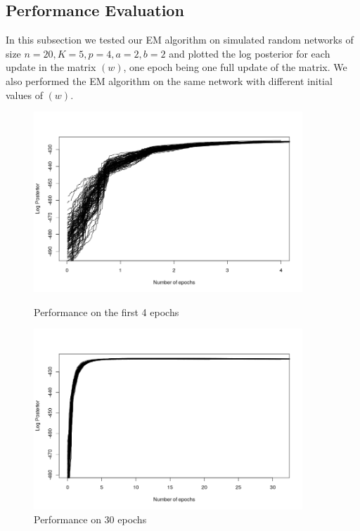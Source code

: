 \documentclass[12pt]{ociamthesis}  %
\begin{document}
	\subsection{Performance Evaluation}
	
	In this subsection we tested our EM algorithm on simulated random networks of size $n = 20, K = 5, p = 4, a = 2, b = 2$ and plotted the log posterior for each update in the matrix $(w)$, one epoch being one full update of the matrix. We also performed the EM algorithm on the same network with different initial values of $(w)$.
	
	\begin{figure}[H]
		\centering
		\begin{minipage}{0.45\textwidth}
			\centering
			\includegraphics[width=0.9\textwidth]{RplotEMAlgo1} %
			\caption{Performance on the first 4 epochs}
			\label{label-image17}
		\end{minipage}\hfill
		\begin{minipage}{0.45\textwidth}
			\centering
			\includegraphics[width=0.9\textwidth]{RplotEMalgo2} %
			\caption{Performance on 30 epochs}
			\label{label-image18}
		\end{minipage}
	\end{figure}
	
\end{document}
